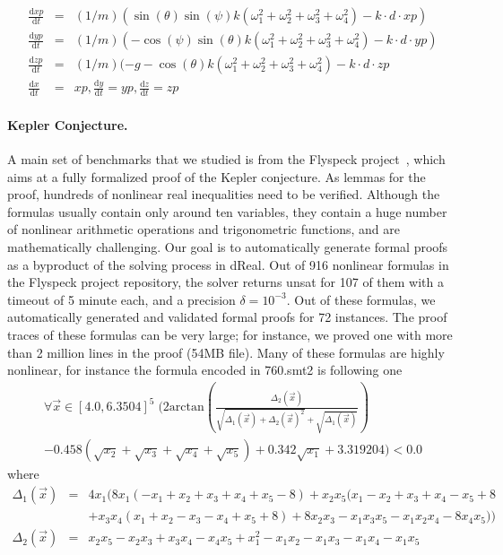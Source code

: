 \documentclass[10pt]{article}
\theoremstyle{definition}
\begin{document}
\begin{eqnarray*}
\frac{\mathrm{d}{xp}}{\mathrm{d}t} &=& (1/m)(\sin(\theta)\sin(\psi)k(\omega_1^2 + \omega_2^2 +\omega_3^2+\omega_4^2) - k\cdot d\cdot{xp})\\
\frac{\mathrm{d}{yp}}{\mathrm{d}t} &=& (1/m)(-\cos(\psi)\sin(\theta)k(\omega_1^2 + \omega_2^2 +\omega_3^2+\omega_4^2) - k\cdot d\cdot{yp})\\
\frac{\mathrm{d}{zp}}{\mathrm{d}t} &=& (1/m)(-g-\cos(\theta)k(\omega_1^2 + \omega_2^2 +\omega_3^2+\omega_4^2) - k\cdot d\cdot{zp}\\
\frac{\mathrm{d}x}{\mathrm{d}t} &=& {xp}, \frac{\mathrm{d}y}{\mathrm{d}t} = {yp}, \frac{\mathrm{d}z}{\mathrm{d}t} = {zp}
\end{eqnarray*}


\paragraph{Kepler Conjecture.} A main set of benchmarks that we studied is from the Flyspeck project~\cite{DBLP:conf/dagstuhl/Hales05,DBLP:conf/nfm/SolovyevH13}, which aims at a 
fully formalized proof of the Kepler conjecture. As lemmas for the
proof, hundreds of nonlinear real inequalities need to be verified.
Although the formulas usually contain only around ten variables, they
contain a huge number of nonlinear arithmetic operations and
trigonometric functions, and are mathematically challenging. Our goal is to automatically generate formal proofs as a byproduct of the solving process in dReal. Out of 916 nonlinear formulas in the Flyspeck
project repository, the solver returns {\sf unsat} for 107 of them with a timeout of 5 minute each, and a precision $\delta=10^{-3}$. Out of these formulas, we automatically generated and validated formal proofs for 72 instances. The proof traces of these formulas can be very
large; for instance, we proved one with more than 2 million lines in the
proof (54MB file). Many of these formulas are highly nonlinear, for instance the formula encoded in 760.smt2 is following one 
\begin{multline*}
\forall\vec{x} \in [4.0, 6.3504]^5\; \Big(2\mathrm{arctan} (\frac{\Delta_2(\vec x)}{\sqrt{\Delta_1(\vec x) + \Delta_2(\vec x)^2} + \sqrt{\Delta_1(\vec x)}})\\
- 0.458(\sqrt{x_2} + \sqrt{x_3} +\sqrt{x_4} + \sqrt{x_5}) + 0.342\sqrt{x_1} + 3.319204\Big) < 0.0
\end{multline*}
where
\begin{eqnarray*}
  \Delta_1(\vec{x}) &=& 4x_1 (8x_1 (-x_1 + x_2 + x_3 + x_4 + x_5 - 8) + x_2 x_5 (x_1 - x_2 + x_3 + x_4 - x_5+8\\%
& &+ x_3x_4(x_1 + x_2 - x_3 - x_4 + x_5 + 8)+ 8 x_2 x_3 - x_1 x_3 x_5 - x_1  x_2  x_4 - 8 x_4 x_5))\\
\Delta_2(\vec{x}) &=& x_2 x_5 -x_2 x_3 + x_3x_4 - x_4 x_5 +x_1^2 -x_1x_2 - x_1x_3 - x_1x_4 -x_1 x_5
\end{eqnarray*}
\end{document}
